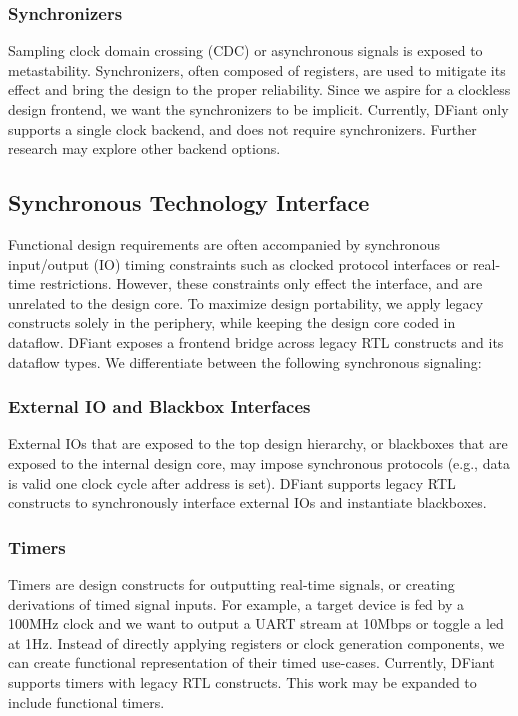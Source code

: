 \subsubsection{Synchronizers}
Sampling clock domain crossing (CDC) or asynchronous signals is exposed to metastability. Synchronizers, often composed of registers, are used to mitigate its effect and bring the design to the proper reliability. Since we aspire for a clockless design frontend, we want the synchronizers to be implicit. Currently, DFiant only supports a single clock backend, and does not require synchronizers. Further research may explore other backend options.

\subsection{Synchronous Technology Interface}
Functional design requirements are often accompanied by synchronous input/output (IO) timing constraints such as clocked protocol interfaces or real-time restrictions. However, these constraints only effect the interface, and are unrelated to the design core. To maximize design portability, we apply legacy constructs solely in the periphery, while keeping the design core coded in dataflow. DFiant exposes a frontend bridge across legacy RTL constructs and its dataflow types. We differentiate between the following synchronous signaling:
\subsubsection{External IO and Blackbox Interfaces}
External IOs that are exposed to the top design hierarchy, or blackboxes that are exposed to the internal design core, may impose synchronous protocols (e.g., data is valid one clock cycle after address is set). DFiant supports legacy RTL constructs to synchronously interface external IOs and instantiate blackboxes. 
\subsubsection{Timers}
Timers are design constructs for outputting real-time signals, or creating derivations of timed signal inputs. For example, a target device is fed by a 100MHz clock and we want to output a UART stream at 10Mbps or toggle a led at 1Hz. Instead of directly applying registers or clock generation components, we can create functional representation of their timed use-cases. Currently, DFiant supports timers with legacy RTL constructs. This work may be expanded to include functional timers.

